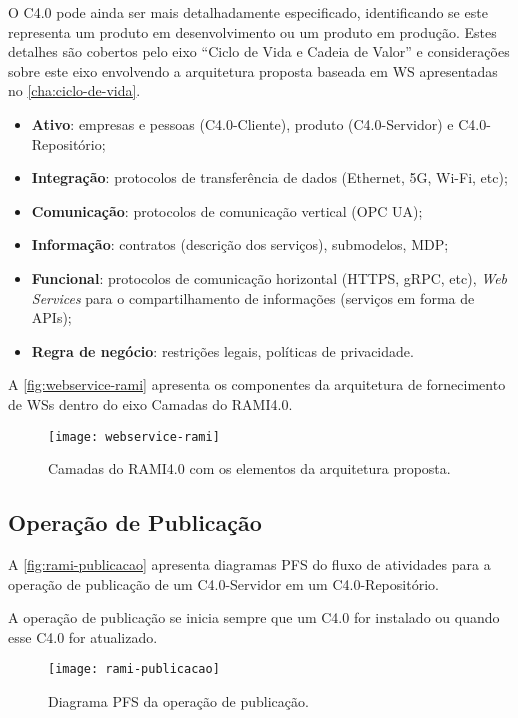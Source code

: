 O C4.0 pode ainda ser mais detalhadamente especificado, identificando se este representa um produto em desenvolvimento ou um produto em produção. Estes detalhes são cobertos pelo eixo ``Ciclo de Vida e Cadeia de Valor'' e considerações sobre este eixo envolvendo a arquitetura proposta baseada em WS apresentadas no \autoref{cha:ciclo-de-vida}.

\begin{itemize}
	\item \textbf{Ativo}: empresas e pessoas (C4.0-Cliente), produto (C4.0-Servidor) e C4.0-Repositório;
	\item \textbf{Integração}: protocolos de transferência de dados (Ethernet, 5G, Wi-Fi, etc);
	\item \textbf{Comunicação}: protocolos de comunicação vertical (OPC UA);
	\item \textbf{Informação}: contratos (descrição dos serviços), submodelos, MDP;
	\item \textbf{Funcional}: protocolos de comunicação horizontal (HTTPS, gRPC, etc), \textit{Web Services} para o compartilhamento de informações (serviços em forma de APIs);
	\item \textbf{Regra de negócio}: restrições legais, políticas de privacidade.
\end{itemize}

A \autoref{fig:webservice-rami} apresenta os componentes da arquitetura de fornecimento de WSs dentro do eixo Camadas do RAMI4.0.%

\begin{figure}[H]
	\centering
	\texttt{[image: webservice-rami]}
	\caption{Camadas do RAMI4.0 com os elementos da arquitetura proposta.}
	\label{fig:webservice-rami}
\end{figure}

\subsection{Operação de Publicação}

A \autoref{fig:rami-publicacao} apresenta diagramas PFS do fluxo de atividades para a operação de publicação de um C4.0-Servidor em um C4.0-Repositório.

A operação de publicação se inicia sempre que um C4.0 for instalado ou quando esse C4.0 for atualizado.

\begin{figure}[th]
	\centering
	\texttt{[image: rami-publicacao]}
	\caption{Diagrama PFS da operação de publicação.}
	\label{fig:rami-publicacao}
\end{figure}

